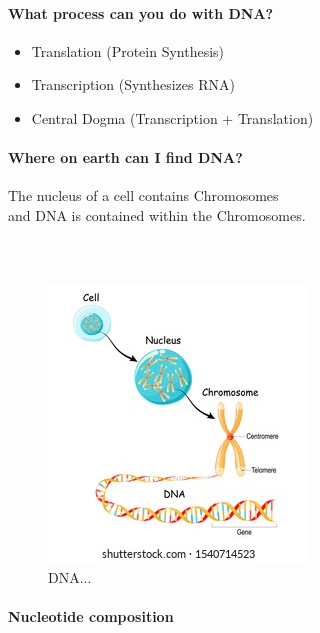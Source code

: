 \paragraph{What process can you do with DNA?}

\begin{itemize}
    \item Translation (Protein Synthesis)
    \item Transcription (Synthesizes RNA)
    \item Central Dogma (Transcription + Translation)
\end{itemize}

\paragraph{Where on earth can I find DNA? \\}
The nucleus of a cell contains Chromosomes \\ 
and DNA is contained within the Chromosomes.

\paragraph{\\}
\begin{figure}[htbp]
    \centerline{\includegraphics{dna2.jpg}}
    \caption{DNA...}
    \label{fig1}
\end{figure}


\paragraph{Nucleotide composition \\}

